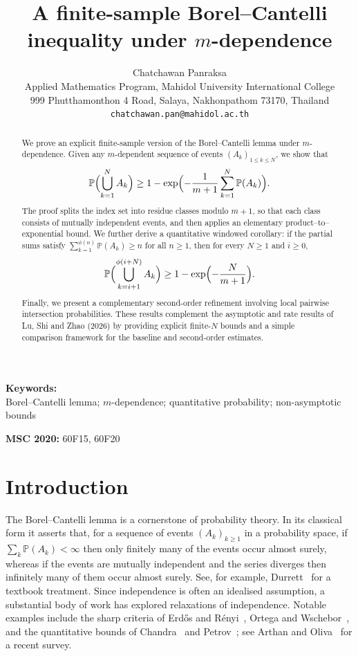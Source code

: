 \documentclass[11pt]{article}
\begin{document}
\title{A finite-sample Borel--Cantelli inequality under $m$-dependence}
\author{Chatchawan Panraksa\\
Applied Mathematics Program, Mahidol University International College\\
999 Phutthamonthon 4 Road, Salaya, Nakhonpathom 73170, Thailand\\
\texttt{chatchawan.pan@mahidol.ac.th}}
\date{}

\maketitle

\begin{abstract}
We prove an explicit finite-sample version of the Borel--Cantelli
lemma under $m$-dependence.  Given any $m$-dependent sequence of
events $(A_k)_{1\leq k\leq N}$, we show that
\[
  \mathbb{P}\Bigl(\bigcup_{k=1}^N A_k\Bigr)
  \ge 1 - \exp\Bigl(-\frac{1}{m+1}
    \sum_{k=1}^{N} \mathbb{P}(A_k)\Bigr).
\]
The proof splits the index set into residue classes modulo $m+1$, so
that each class consists of mutually independent events, and then
applies an elementary product--to--exponential bound.  We further
derive a quantitative windowed corollary: if the partial sums satisfy
\(\sum_{k=1}^{\phi(n)}\mathbb{P}(A_k)\ge n\) for all \(n\ge1\), then for
every \(N\ge1\) and \(i\ge0\),
\[
  \mathbb{P}\Bigl(\bigcup_{k=i+1}^{\phi(i+N)} A_k\Bigr)
  \ge 1-\exp\Bigl(-\frac{N}{m+1}\Bigr).
\]
Finally, we present a complementary second-order refinement involving
local pairwise intersection probabilities.  These results complement
the asymptotic and rate results of Lu, Shi and Zhao (2026) by
providing explicit finite-$N$ bounds and a simple comparison framework
for the baseline and second-order estimates.
\end{abstract}

\medskip
\noindent\textbf{Keywords:}\\
Borel--Cantelli lemma; $m$-dependence; quantitative probability;
non-asymptotic bounds

\smallskip
\noindent\textbf{MSC 2020:} 60F15, 60F20

\section{Introduction}
The Borel--Cantelli lemma is a cornerstone of probability theory.  In
its classical form it asserts that, for a sequence of events
\((A_k)_{k\geq 1}\) in a probability space, if
\(\sum_k \mathbb{P}(A_k)<\infty\) then only finitely many of the
events occur almost surely, whereas if the events are mutually
independent and the series diverges then infinitely many of them
occur almost surely.  See, for example, Durrett~\cite{Durrett2010}
for a textbook treatment.  Since independence is often an idealised
assumption, a substantial body of work has explored relaxations of
independence.  Notable examples include the sharp criteria of
Erd\H{o}s and R\'enyi~\cite{ErdosRenyi1959}, Ortega and
Wschebor~\cite{OrtegaWschebor1984}, and the quantitative bounds of
Chandra~\cite{Chandra1999} and Petrov~\cite{Petrov2002}; see
Arthan and Oliva~\cite{ArthanOliva2021} for a recent survey.
\end{document}
